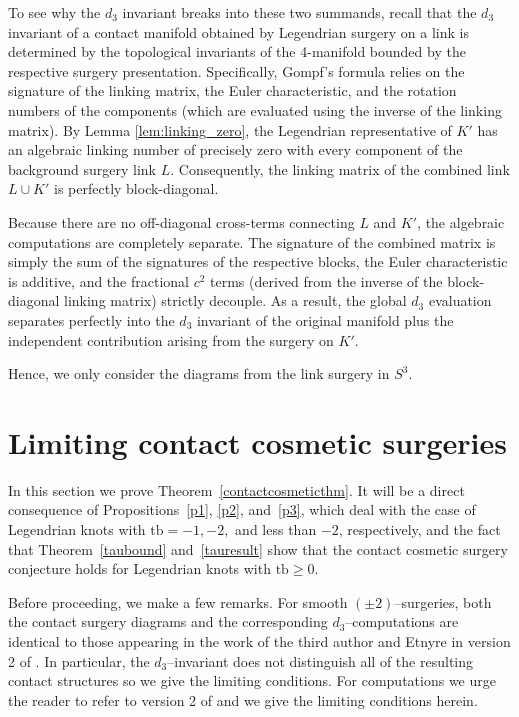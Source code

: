 \documentclass[12pt]{amsart}
\theoremstyle{definition}
\theoremstyle{definition}
\newcommand{\tb}{\text{tb}}
\begin{document}
To see why the $d_3$ invariant breaks into these two summands, recall that the $d_3$ invariant of a contact manifold obtained by Legendrian surgery on a link is determined by the topological invariants of the 4-manifold bounded by the respective surgery presentation. Specifically, Gompf's formula relies on the signature of the linking matrix, the Euler characteristic, and the rotation numbers of the components (which are evaluated using the inverse of the linking matrix). By Lemma \ref{lem:linking_zero}, the Legendrian representative of $K'$ has an algebraic linking number of precisely zero with every component of the background surgery link $L$. Consequently, the linking matrix of the combined link $L \cup K'$ is perfectly block-diagonal. 

Because there are no off-diagonal cross-terms connecting $L$ and $K'$, the algebraic computations are completely separate. The signature of the combined matrix is simply the sum of the signatures of the respective blocks, the Euler characteristic is additive, and the fractional $c^2$ terms (derived from the inverse of the block-diagonal linking matrix) strictly decouple. As a result, the global $d_3$ evaluation separates perfectly into the $d_3$ invariant of the original manifold plus the independent contribution arising from the surgery on $K'$. 

Hence, we only consider the diagrams from the link surgery in $S^3$.

\section{Limiting contact cosmetic surgeries}\label{obstruction}
In this section we prove Theorem~\ref{contactcosmeticthm}. It will be a direct consequence of Propositions~\ref{p1}, \ref{p2}, and~\ref{p3}, which deal with the case of Legendrian knots with $\tb=-1, -2,$ and less than $-2$, respectively, and the fact that Theorem~\ref{taubound} and~\ref{tauresult} show that the contact cosmetic surgery conjecture holds for Legendrian knots with $\tb\geq 0$. 


Before proceeding, we make a few remarks.
For smooth $(\pm 2)$–surgeries, both the
contact surgery diagrams and the corresponding
$d_3$–computations are identical to those appearing
in the work of the third author and Etnyre in version 2 of \cite{ES}. In particular, the $d_3$–invariant does not
distinguish all of the resulting contact structures so we give the limiting conditions. For computations we urge the reader to refer to version 2 of \cite{ES} and we give the limiting conditions herein.
\end{document}
